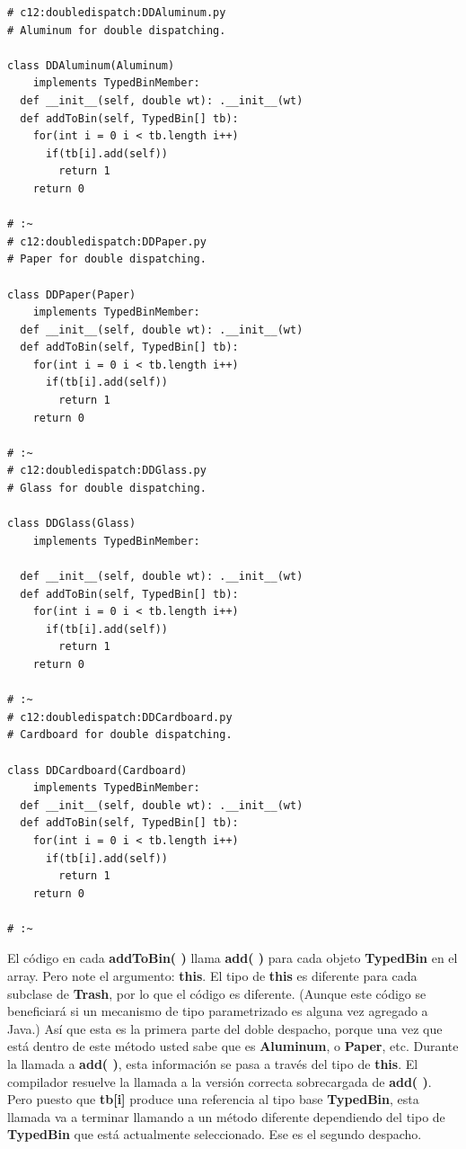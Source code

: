 \documentclass{article}
\begin{document}
\begin{lstlisting} 
# c12:doubledispatch:DDAluminum.py 
# Aluminum for double dispatching. 

class DDAluminum(Aluminum)  
    implements TypedBinMember: 
  def __init__(self, double wt): .__init__(wt)  
  def addToBin(self, TypedBin[] tb): 
    for(int i = 0 i < tb.length i++) 
      if(tb[i].add(self)) 
        return 1 
    return 0 
    
# :~ 
# c12:doubledispatch:DDPaper.py 
# Paper for double dispatching. 

class DDPaper(Paper)  
    implements TypedBinMember: 
  def __init__(self, double wt): .__init__(wt)  
  def addToBin(self, TypedBin[] tb): 
    for(int i = 0 i < tb.length i++) 
      if(tb[i].add(self)) 
        return 1 
    return 0 
    
# :~ 
# c12:doubledispatch:DDGlass.py 
# Glass for double dispatching. 

class DDGlass(Glass)  
    implements TypedBinMember: 

  def __init__(self, double wt): .__init__(wt)  
  def addToBin(self, TypedBin[] tb): 
    for(int i = 0 i < tb.length i++) 
      if(tb[i].add(self)) 
        return 1 
    return 0 
    
# :~ 
# c12:doubledispatch:DDCardboard.py 
# Cardboard for double dispatching. 

class DDCardboard(Cardboard)  
    implements TypedBinMember: 
  def __init__(self, double wt): .__init__(wt)  
  def addToBin(self, TypedBin[] tb): 
    for(int i = 0 i < tb.length i++) 
      if(tb[i].add(self)) 
        return 1 
    return 0 
    
# :~ 
\end{lstlisting}

El código en cada \textbf{addToBin( )} llama \textbf{add( )} para cada objeto \textbf{TypedBin} en el array. Pero note el argumento: \textbf{this}. El tipo de \textbf{this} es diferente para cada subclase de \textbf{Trash}, por lo que el código es diferente. (Aunque este código se beneficiará si un mecanismo de tipo parametrizado es alguna vez agregado a Java.) Así que esta es la primera parte del doble despacho, porque una vez que está dentro de este método usted sabe que es \textbf{Aluminum},  o \textbf{Paper}, etc. Durante la llamada a \textbf{add( )}, esta información se pasa a través del tipo de \textbf{this}. El compilador resuelve la llamada a la versión correcta sobrecargada de \textbf{add( )}. Pero puesto que \textbf{tb[i]} produce una referencia al tipo base \textbf{TypedBin}, esta llamada va a terminar llamando a un método diferente dependiendo del tipo de \textbf{TypedBin} que está actualmente seleccionado. Ese es el segundo despacho. \newline
\end{document}
